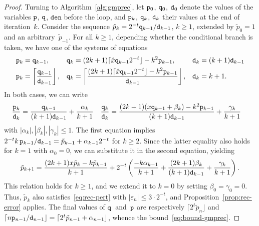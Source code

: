 \documentclass{siamart0216}
\begin{document}
\begin{proof}
Turning to Algorithm~\ref{alg:gmprec},
let $\mathtt p_0$, $\mathtt q_0$, $\mathtt d_0$ denote the values of the variables
$\mathtt p$, $\mathtt q$, $\mathtt{den}$ before the loop,
and $\mathtt p_k$, $\mathtt q_k$, $\mathtt d_k$ their values at the end of iteration~$k$.
Consider the sequence
$\tilde p_k = 2^{-t} \mathtt q_{k-1}/\mathtt d_{k-1}$, $k \geq 1$,
extended by $\tilde p_0 = 1$ and an arbitrary~$\tilde p_{-1}$.
For all $k \geq 1$, depending whether the conditional branch is taken, we
have one of the systems of equations
\begin{align}
  \mathtt p_k &= \mathtt q_{k-1}, &
  \mathtt q_k &= (2k+1) \lceil \hat x \mathtt q_{k-1} 2^{-t} \rfloor
          - k^2 \mathtt p_{k-1}, &
  \mathtt d_k &= (k+1) \mathtt d_{k-1} \\
  \mathtt p_k &= \left\lceil \frac{\mathtt q_{k-1}}{\mathtt d_{k-1}} \right\rfloor, &
  \mathtt q_k &= \left\lceil \frac{
          (2k+1) \lceil \hat x \mathtt q_{k-1} 2^{-t} \rfloor - k^2 \mathtt p_{k-1}}
          {\mathtt d_{k-1}} \right\rfloor, &
  \mathtt d_k &= k+1.
\end{align}
In both cases, we can write
\begin{align*}
  \frac{\mathtt p_k}{\mathtt d_k}
  &= \frac{\mathtt q_{k-1}}{(k+1) \mathtt d_{k-1}} + \frac{\alpha_k}{k+1}
   &
  \frac{\mathtt q_k}{\mathtt d_k}
  &= \frac{ (2k+1) (x \mathtt q_{k-1} + \beta_k) - k^2 \mathtt p_{k-1} }
          { (k+1) \mathtt d_{k-1} }
     + \frac{\gamma_k}{k+1}
\end{align*}
with $|\alpha_k|, |\beta_k|, |\gamma_k| \leq 1$.
The first equation implies
$2^{-t} k \, \mathtt p_{k-1}/\mathtt d_{k-1} = \tilde p_{k-1} + \alpha_{k-1} 2^{-t}$
for $k \geq 2$.
Since the latter equality also holds for $k = 1$ with $\alpha_0 = 0$, we can
substitute it in the second equation, yielding
\[
  \tilde p_{k+1}
  = \frac{ (2k+1) x \tilde p_k - k \tilde p_{k-1} }{k+1}
     + 2^{-t} \left(
          \frac{-k \alpha_{k-1}}{k+1}
        + \frac{(2k + 1) \beta_k}{(k+1) \mathtt d_{k-1}}
        + \frac{\gamma_k}{k+1}
       \right).
\]
This relation holds for $k \geq 1$, and we extend it to $k=0$ by setting
$\beta_0 = \gamma_0 = 0$.
Thus, $\tilde p_k$ also satisfies~\eqref{eq:rec-pert} with
$|\varepsilon_n| \leq 3 \cdot 2^{-t}$, and Proposition \ref{prop:rec-error} applies.
The final values of $\mathtt q$~and~$\mathtt p$ are respectively
$\lceil 2^t \tilde p_n \rfloor$
and
$\lceil n \mathtt p_{n-1}/\mathtt d_{n-1} \rfloor
= \lceil 2^t \tilde p_{n-1} + \alpha_{n-1} \rfloor$,
whence the bound~\eqref{eq:bound-gmprec}.
\end{proof}
\end{document}
